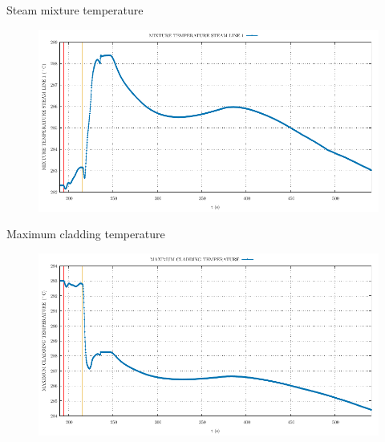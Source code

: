 \begin{frame}{Steam mixture temperature}
	\begin{figure}
		\centering
		\includegraphics[width=\textwidth]{./graphs/MIXTURE TEMPERATURE STEAM LINE 1_comp.pdf}
		
	\end{figure}
	
\end{frame}
\begin{frame}{Maximum cladding temperature}
	\begin{figure}
		\centering
		\includegraphics[width=\textwidth]{./graphs/MAXIMUM CLADDING TEMPERATURE_comp.pdf}
		
	\end{figure}
\end{frame}
%		
%	

%		
%	
%		
%	
%






